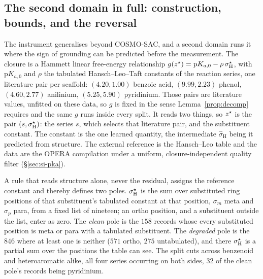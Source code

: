 \subsection{The second domain in full: construction, bounds, and the reversal}
\label{sec:si-pka-main}
The instrument generalises beyond COSMO-SAC, and a second domain runs it where the sign of grounding
can be predicted before the measurement. The closure is a Hammett linear free-energy relationship
$g(z^\star)=\mathrm pK_{a,0}-\rho\,\sigma_{\mathrm H}^\star$, with $\mathrm pK_{a,0}$ and $\rho$ the tabulated
Hansch--Leo--Taft constants of the reaction series, one literature pair per scaffold: $(4.20,1.00)$
benzoic acid, $(9.99,2.23)$ phenol, $(4.60,2.77)$ anilinium, $(5.25,5.90)$ pyridinium. Those pairs
are literature values, unfitted on these data, so $g$ is fixed in the sense
Lemma~\ref{prop:decomp} requires and the same $g$ runs inside every split. It reads two things, so
$z^\star$ is the pair $(s,\sigma_{\mathrm H}^\star)$: the series $s$, which selects that literature pair, and
the substituent constant. The constant is the one learned quantity, the intermediate
$\hat\sigma_{\mathrm H}$ being it predicted from structure. The external reference is the
Hansch--Leo table \cite{hansch1991survey} and the data are the OPERA compilation
\cite{mansouri2019opera} under a uniform, closure-independent quality filter
(\S\ref{sec:si-pka}).

A rule that reads structure alone, never the residual, assigns the reference constant and thereby
defines two poles. $\sigma_{\mathrm H}^\star$ is the sum over substituted ring positions of that substituent's
tabulated constant at that position, $\sigma_m$ meta and $\sigma_p$ para, from a fixed list of
nineteen; an ortho position, and a substituent outside the list, enter as zero. The \emph{clean}
pole is the $158$ records whose every substituted position is meta or para with a tabulated
substituent. The \emph{degraded} pole is the $846$ where at least one is neither ($571$ ortho, $275$
untabulated), and there $\sigma_{\mathrm H}^\star$ is a partial sum over the positions the table can see. The
split cuts across benzenoid and heteroaromatic alike, all four series occurring on both sides, $32$
of the clean pole's records being pyridinium.

